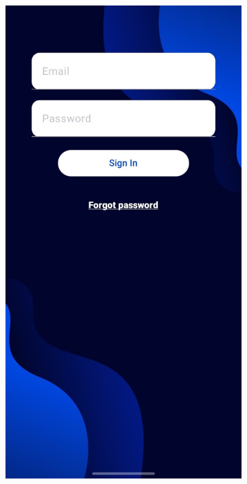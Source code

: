 \begin{figure}[H]
  \centering
  \begin{subfigure}{0.2\textwidth}
    \includegraphics[width=\textwidth]{images/3-aplicatia-android/sign_in_screen.jpeg}
  \caption{}
  \label{fig:sign_in_screen}

\end{subfigure}
\end{figure}
